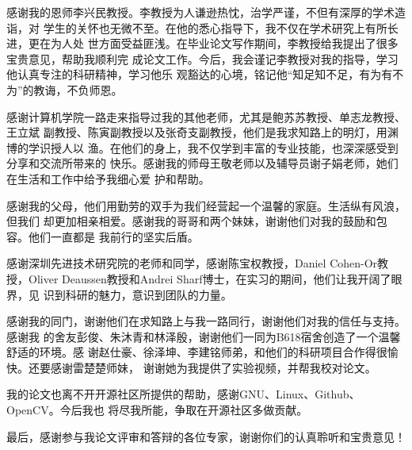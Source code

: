 \begin{ack}

  感谢我的恩师李兴民教授。李教授为人谦逊热忱，治学严谨，不但有深厚的学术造诣，对
  学生的关怀也无微不至。在他的悉心指导下，我不仅在学术研究上有所长进，更在为人处
  世方面受益匪浅。在毕业论文写作期间，李教授给我提出了很多宝贵意见，帮助我顺利完
  成论文工作。今后，我会谨记李教授对我的指导，学习他认真专注的科研精神，学习他乐
  观豁达的心境，铭记他“知足知不足，有为有不为”的教诲，不负师恩。

  感谢计算机学院一路走来指导过我的其他老师，尤其是鲍苏苏教授、单志龙教授、王立斌
  副教授、陈寅副教授以及张奇支副教授，他们是我求知路上的明灯，用渊博的学识授人以
  渔。在他们的身上，我不仅学到丰富的专业技能，也深深感受到分享和交流所带来的
  快乐。感谢我的师母王敬老师以及辅导员谢子娟老师，她们在生活和工作中给予我细心爱
  护和帮助。

  感谢我的父母，他们用勤劳的双手为我们经营起一个温馨的家庭。生活纵有风浪，但我们
  却更加相亲相爱。感谢我的哥哥和两个妹妹，谢谢他们对我的鼓励和包容。他们一直都是
  我前行的坚实后盾。
  
  感谢深圳先进技术研究院的老师和同学，感谢陈宝权教授，Daniel Cohen-Or教
  授，Oliver Deaussen教授和Andrei Sharf博士，在实习的期间，他们让我开阔了眼界，见
  识到科研的魅力，意识到团队的力量。

  感谢我的同门，谢谢他们在求知路上与我一路同行，谢谢他们对我的信任与支持。感谢我
  的舍友彭俊、朱沐青和林泽殷，谢谢他们一同为B618宿舍创造了一个温馨舒适的环境。感
  谢赵仕豪、徐泽坤、李建铭师弟，和他们的科研项目合作得很愉快。还要感谢雷楚楚师妹，
  谢谢她为我提供了实验视频，并帮我校对论文。

  我的论文也离不开开源社区所提供的帮助，感谢GNU、Linux、Github、OpenCV。今后我也
  将尽我所能，争取在开源社区多做贡献。

  最后，感谢参与我论文评审和答辩的各位专家，谢谢你们的认真聆听和宝贵意见！
  
\end{ack}

